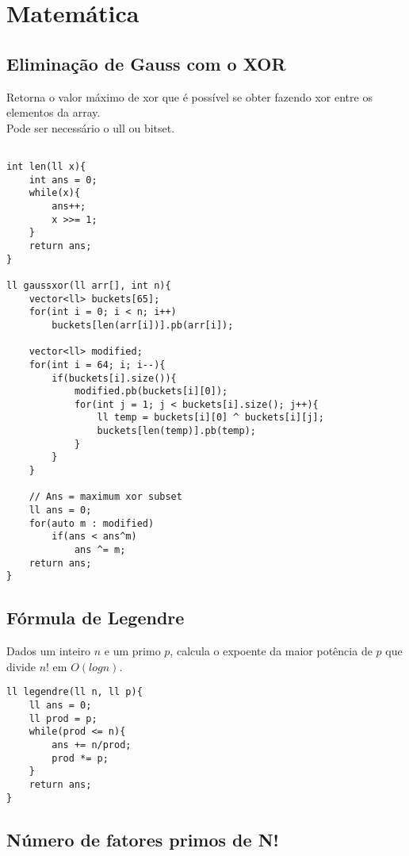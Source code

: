 \chapter{Matemática}


\section{Eliminação de Gauss com o XOR}

Retorna o valor máximo de xor que é possível se obter fazendo xor entre os elementos da array. \\	
Pode ser necessário o ull ou bitset.
\begin{multicols}{2}
	\begin{lstlisting}

int len(ll x){
	int ans = 0;
	while(x){
		ans++;
		x >>= 1;
	}
	return ans;
}
	
ll gaussxor(ll arr[], int n){
	vector<ll> buckets[65];
	for(int i = 0; i < n; i++)
		buckets[len(arr[i])].pb(arr[i]);
	
	vector<ll> modified;
	for(int i = 64; i; i--){
		if(buckets[i].size()){
			modified.pb(buckets[i][0]);
			for(int j = 1; j < buckets[i].size(); j++){
				ll temp = buckets[i][0] ^ buckets[i][j];
				buckets[len(temp)].pb(temp);
			}
		}
	}
	
	// Ans = maximum xor subset
	ll ans = 0;
	for(auto m : modified)
		if(ans < ans^m)
			ans ^= m;
	return ans;
}
	\end{lstlisting}
\end{multicols}
\section{Fórmula de Legendre}

Dados um inteiro $n$ e um primo $p$, calcula o expoente da maior potência de $p$ que divide $n!$ em $O(logn)$.
\begin{multicols}{2}
	\begin{lstlisting}
ll legendre(ll n, ll p){
	ll ans = 0;
	ll prod = p;
	while(prod <= n){
		ans += n/prod;
		prod *= p;
	}
	return ans;
}
	\end{lstlisting}
\end{multicols}

\section{Número de fatores primos de N!}

